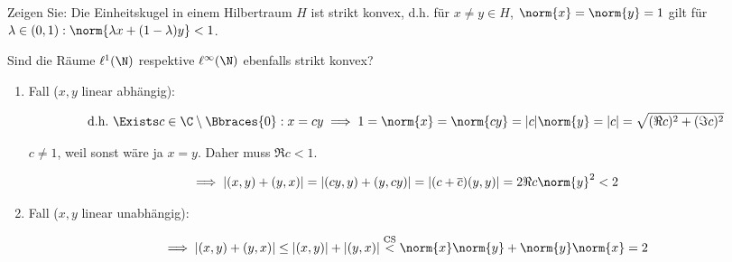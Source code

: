 
\begin{exercise}

Zeigen Sie:
Die Einheitskugel in einem Hilbertraum $H$ ist strikt konvex, d.h. für $x \neq y \in H$, $\norm{x} = \norm{y} = 1$ gilt für $\lambda \in (0, 1): \norm{\lambda x + (1 - \lambda) y} < 1$.

Sind die Räume $\ell^1(\N)$ respektive $\ell^\infty(\N)$ ebenfalls strikt konvex?

\end{exercise}


\begin{solution}

\phantom{}


\begin{enumerate}[label = \arabic*.]

    \item Fall ($x, y$ linear abhängig):
    
    \begin{align*}
        \text{d.h.}~
        \Exists c \in \C \setminus \Bbraces{0}:
        x = c y
        \implies
        1 = \norm{x} = \norm{c y} = |c| \norm{y} = |c| = \sqrt{(\Re c)^2 + (\Im c)^2}
    \end{align*}

    $c \neq 1$, weil sonst wäre ja $x = y$.
    Daher muss $\Re c < 1$.

    \begin{align*}
        \implies
        |(x, y) + (y, x)|
        =
        |(c y, y) + (y, c y)|
        =
        |(c + \overline c) (y, y)|
        =
        2 \Re c \norm{y}^2
        <
        2
    \end{align*}

    \item Fall ($x, y$ linear unabhängig):

    \begin{align*}
        \implies
        |(x, y) + (y, x)|
        \leq
        |(x, y)| + |(y, x)|
        \stackrel
        {
            \mathrm{CS}
        }{<}
        \norm{x} \norm{y} + \norm{y} \norm{x}
        =
        2
    \end{align*}


\end{enumerate}
\end{solution}
